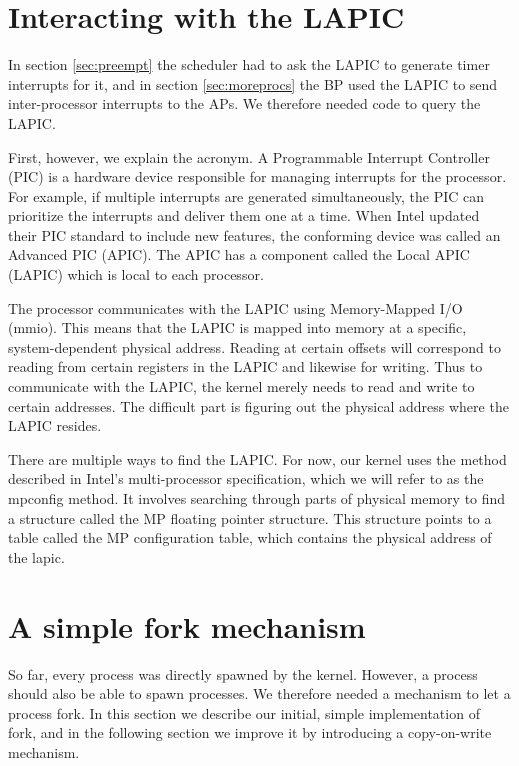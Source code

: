 \documentclass{report}
\begin{document}
\section{Interacting with the LAPIC}
\label{sec:mpconfig}

In section \ref{sec:preempt} the scheduler had to ask the LAPIC to generate
timer interrupts for it, and in section \ref{sec:moreprocs} the BP used the
LAPIC to send inter-processor interrupts to the APs. We therefore needed code
to query the LAPIC.

First, however, we explain the acronym. A Programmable Interrupt Controller
(PIC) is a hardware device responsible for managing interrupts for the
processor. For example, if multiple interrupts are generated simultaneously,
the PIC can prioritize the interrupts and deliver them one at a time. When
Intel updated their PIC standard to include new features, the conforming
device was called an Advanced PIC (APIC). The APIC has a component called the
Local APIC (LAPIC) which is local to each processor.

The processor communicates with the LAPIC using Memory-Mapped I/O
(\gls{mmio}). This means that the LAPIC is mapped into memory at a specific,
system-dependent physical address. Reading at certain offsets will correspond
to reading from certain registers in the LAPIC and likewise for writing. Thus
to communicate with the LAPIC, the kernel merely needs to read and write to
certain addresses. The difficult part is figuring out the physical address
where the LAPIC resides.

There are multiple ways to find the LAPIC. For now, our kernel uses the method
described in Intel's multi-processor specification, which we will refer to as
the \gls{mpconfig} method. It involves searching through parts of physical
memory to find a structure called the MP floating pointer structure. This
structure points to a table called the MP configuration table, which contains
the physical address of the \gls{lapic}. 



\section{A simple fork mechanism}
So far, every process was directly spawned by the kernel. However, a process
should also be able to spawn processes. We therefore needed a mechanism to let
a process fork. In this section we describe our initial, simple implementation
of fork, and in the following section we improve it by introducing a
copy-on-write mechanism.
\end{document}
